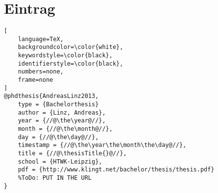\chapter*{\BibTeX{} Eintrag}


\begin{lstlisting}[
	language=TeX,
	backgroundcolor=\color{white},
	keywordstyle=\color{black},
	identifierstyle=\color{black},
	numbers=none,
	frame=none
]
@phdthesis{AndreasLinz2013,
	type = {Bachelorthesis}
	author = {Linz, Andreas},
	year = {//@\the\year@//},
	month = {//@\the\month@//},
	day = {//@\the\day@//},
	timestamp = {//@\the\year\the\month\the\day@//},
	title = {//@\thesisTitle{}@//},
	school = {HTWK-Leipzig},
	pdf = {http://www.klingt.net/bachelor/thesis/thesis.pdf}
	%ToDo: PUT IN THE URL
}
\end{lstlisting}